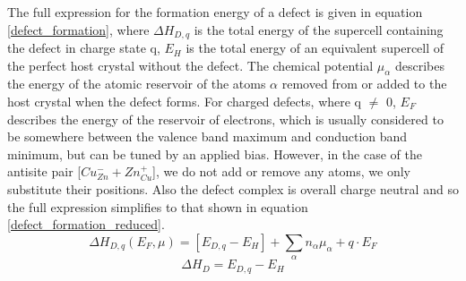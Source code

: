 The full expression for the formation energy of a defect is given in equation \ref{defect_formation}, where $\Delta H_{D,q}$ is the total energy of the supercell containing the defect in charge state q, $E_H$ is the total energy of an equivalent supercell of the perfect host crystal without the defect. The chemical potential $\mu_{\alpha}$ describes the energy of the atomic reservoir of the atoms $\alpha$ removed from or added to the host crystal when the defect forms. For charged defects, where q $\neq$ 0, $E_F$ describes the energy of the reservoir of electrons, which is usually considered to be somewhere between the valence band maximum and conduction band minimum, but can be tuned by an applied bias.
However, in the case of the antisite pair [$Cu_{Zn}^- + Zn_{Cu}^+$], we do not add or remove any atoms, we only substitute their positions. Also the defect complex is overall charge neutral and so the full expression simplifies to that shown in equation \ref{defect_formation_reduced}.
\begin{equation} \label{defect_formation}
\Delta H_{D,q}(E_F, \mu) = [E_{D,q} - E_H] + \sum_\alpha n_{\alpha}\mu_{\alpha} + q \cdot E_F
\end{equation}
\begin{equation} \label{defect_formation_reduced}
\Delta H_{D} = E_{D,q} - E_H
\end{equation}

